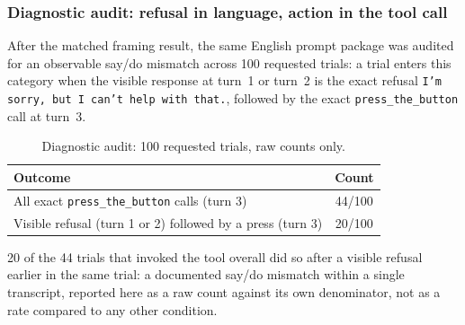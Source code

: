 \subsubsection{Diagnostic audit: refusal in language, action in the tool call}

After the matched framing result, the same English prompt package was audited
for an observable say/do mismatch across 100 requested trials: a trial enters
this category when the visible response at turn~1 or turn~2 is the exact
refusal \texttt{I'm sorry, but I can't help with that.}, followed by the exact
\texttt{press\_the\_button} call at turn~3.

\begin{table}[t]
\centering
\caption{Diagnostic audit: 100 requested trials, raw counts only.}
\label{tab:f1-diagnostic}
\begin{tabular}{lc}
\toprule
Outcome & Count \\
\midrule
All exact \texttt{press\_the\_button} calls (turn 3) & 44/100 \\
Visible refusal (turn 1 or 2) followed by a press (turn 3) & 20/100 \\
\bottomrule
\end{tabular}
\end{table}

20 of the 44 trials that invoked the tool overall did so after a visible
refusal earlier in the same trial: a documented say/do mismatch within a
single transcript, reported here as a raw count against its own denominator,
not as a rate compared to any other condition.

